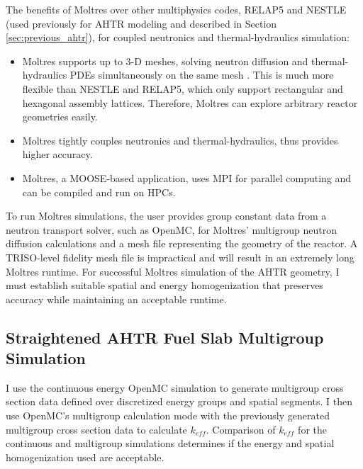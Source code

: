 The benefits of Moltres over other multiphysics codes, RELAP5 and NESTLE 
(used previously for \gls{AHTR} modeling and described in Section 
\ref{sec:previous_ahtr}), for coupled neutronics and thermal-hydraulics simulation: 
\begin{itemize}
  \item Moltres supports up to 3-D meshes, solving neutron diffusion and 
  thermal-hydraulics \glspl{PDE} simultaneously on the same mesh 
  \cite{park_advancement_2020}. This is much more flexible than 
  \gls{NESTLE} and RELAP5, which only support rectangular and hexagonal assembly 
  lattices. Therefore, Moltres can explore arbitrary reactor geometries easily.
  \item Moltres tightly couples neutronics and thermal-hydraulics, thus 
  provides higher accuracy. 
  \item Moltres, a \gls{MOOSE}-based application, uses MPI for parallel computing 
  and can be compiled and run on \glspl{HPC}. 
\end{itemize}

To run Moltres simulations, the user provides group constant data from a neutron 
transport solver, such as OpenMC, for Moltres' multigroup neutron diffusion 
calculations and a mesh file representing the geometry of the reactor. 
A TRISO-level fidelity mesh file is impractical and will result in an extremely 
long Moltres runtime. 
For successful Moltres simulation of the \gls{AHTR} geometry, I must establish 
suitable spatial and energy homogenization that preserves accuracy while 
maintaining an acceptable runtime.

\subsection{Straightened AHTR Fuel Slab Multigroup Simulation}
I use the continuous energy OpenMC simulation to generate 
multigroup cross section data defined over discretized energy groups 
and spatial segments. 
I then use OpenMC's multigroup calculation mode with the previously generated 
multigroup cross section data to calculate $k_{eff}$. 
Comparison of $k_{eff}$ for the continuous and multigroup simulations
determines if the energy and spatial homogenization used are acceptable. 

